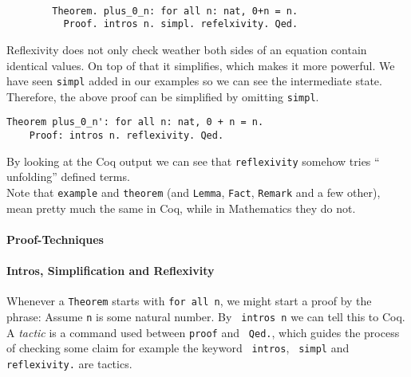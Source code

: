    \begin{example}
	   \begin{theorem} ~\\\vspace{-5mm}
  	   {\normalfont \begin{lstlisting}
   		Theorem. plus_0_n: for all n: nat, 0+n = n.
   		  Proof. intros n. simpl. refelxivity. Qed.
    	\end{lstlisting}}	
	\end{theorem}
	\end{example}              
    \begin{remark}
    	Reflexivity does not only check weather both sides of an equation contain identical values. 
    	On top of that it simplifies, which makes it more powerful. 
    	We have seen \lstinline!simpl! added in our examples so we can see the intermediate state.
    	Therefore, the above proof can be simplified by omitting \lstinline!simpl!. 
     \end{remark}
     



	\begin{lstlisting}[caption={ \lstinline!plus_0_n'!}, label= lst:plus0nPrime]
    Theorem plus_0_n': for all n: nat, 0 + n = n.
    Proof: intros n. reflexivity. Qed.	
    \end{lstlisting}    
    By looking at the Coq output we can see that \lstinline!reflexivity! somehow tries ``	unfolding'' defined terms.\\    
    Note that \lstinline!example! and \lstinline!theorem! (and \lstinline!Lemma!, \lstinline!Fact!, \lstinline!Remark! and a few other),
    mean pretty much the same in Coq, while in Mathematics they do not.
    
   
     
    \paragraph{Proof-Techniques}
    
    \paragraph{Intros, Simplification and Reflexivity}
     Whenever a \lstinline!Theorem! starts with \lstinline!for all n!, we might start a proof by the phrase:
     Assume \lstinline!n! is some natural number. By \lstinline! intros n! we can tell this to Coq.\\
     A {\itshape tactic} is a command used between \lstinline!proof! and \lstinline! Qed.!, 
     which guides the process of checking some claim for example the keyword \lstinline! intros!, \lstinline! simpl! and \lstinline!reflexivity.! 
     are tactics.
     
